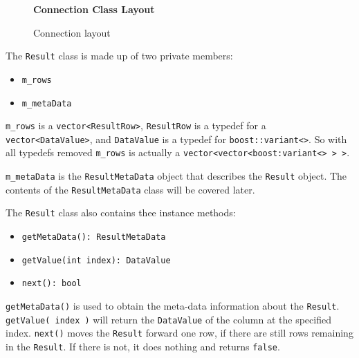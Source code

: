 \documentclass[letterpaper, 12pt]{article}
\begin{document}
  \begin{figure}
    \centering
    \textbf{Connection Class Layout}
	\caption{Connection layout}    
  \end{figure}
  \par\vspace{\baselineskip}
  
  The \lstinline[basicstyle=\ttfamily]|Result| class is made up of two private members:
  \begin{itemize}
    \item \lstinline|m_rows|
    \item \lstinline|m_metaData|
  \end{itemize}
  \lstinline|m_rows| is a
  \lstinline|vector<ResultRow>|, 
  \lstinline|ResultRow| is a typedef for
  a \lstinline|vector<DataValue>|, and 
  \lstinline|DataValue| is a typedef for 
  \lstinline|boost::variant<>|.
  So with all typedefs removed \lstinline|m_rows| is
  actually a
  \lstinline|vector<vector<boost:variant<> > >|.
  
  \lstinline|m_metaData| is the 
  \lstinline|ResultMetaData| object that describes the 
  \lstinline|Result| object. The contents of the 
  \lstinline|ResultMetaData| class will be covered later.
  \par\vspace{\baselineskip}
  The \lstinline[basicstyle=\ttfamily]|Result| class also contains thee instance methods:
  \begin{itemize}
    \item \lstinline|getMetaData(): ResultMetaData|
    \item \lstinline|getValue(int index): DataValue|
    \item \lstinline|next(): bool|
  \end{itemize}
  \lstinline|getMetaData()| is used to obtain the meta-data 
  information about the \lstinline[basicstyle=\ttfamily]|Result|. 
  \lstinline|getValue( index )| will return the 
  \lstinline|DataValue| of the column at the specified index.
  \lstinline|next()| moves the 
  \lstinline|Result| forward one row, if there are still rows 
  remaining in the \lstinline[basicstyle=\ttfamily]|Result|. If there is not, it does 
  nothing and returns \lstinline[basicstyle=\ttfamily]|false|.
  
\end{document}
